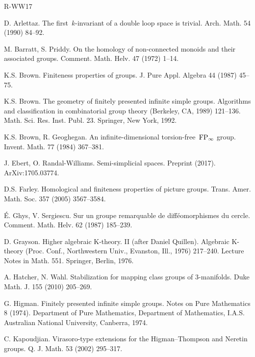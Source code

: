 

\begin{thebibliography}{R-WW17}

 D. Arlettaz. The first~$k$-invariant of a double loop space is trivial. Arch. Math. 54 (1990) 84--92.

M. Barratt, S. Priddy. On the homology of non-connected monoids and their associated groups. Comment. Math. Helv. 47 (1972) 1--14.

 K.S. Brown. Finiteness properties of groups. J. Pure Appl. Algebra 44 (1987) 45--75.

 K.S. Brown. The geometry of finitely presented infinite simple groups. Algorithms and classification in combinatorial group theory (Berkeley, CA, 1989) 121--136. Math. Sci. Res. Inst. Publ. 23. Springer, New York, 1992.

 K.S. Brown, R. Geoghegan. An infinite-dimensional torsion-free~$\mathrm{F}\mathrm{P}_\infty$ group. Invent. Math. 77 (1984) 367--381.

 J. Ebert, O. Randal-Williams. Semi-simplicial spaces. Preprint (2017). ArXiv:1705.03774.   

 D.S. Farley. Homological and finiteness properties of picture groups. Trans. Amer. Math. Soc. 357 (2005) 3567--3584.

 \'E. Ghys, V. Sergiescu. Sur un groupe remarquable de diff\'eo\-mor\-phismes du cercle. Comment. Math. Helv. 62 (1987) 185--239.

 D. Grayson. Higher algebraic K-theory. II (after Daniel Quillen). Algebraic K-theory (Proc. Conf., Northwestern Univ., Evanston, Ill., 1976) 217--240. Lecture Notes in Math. 551. Springer, Berlin, 1976.

 A. Hatcher, N. Wahl. Stabilization for mapping class groups of 3-mani\-folds. Duke Math. J. 155 (2010) 205--269.

 G. Higman. Finitely presented infinite simple groups. Notes on Pure Mathematics 8 (1974). Department of Pure Mathematics, Department of Mathematics, I.A.S. Australian National University, Canberra, 1974.

 C. Kapoudjian. Virasoro-type extensions for the Higman--Thompson and Neretin groups. Q. J. Math. 53 (2002) 295--317.


\end{thebibliography}
